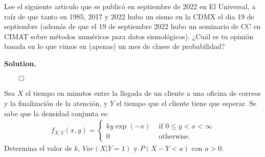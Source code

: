 \documentclass{article}
\theoremstyle{problemstyle}
\newenvironment{solution}{%
  \begin{mdframed}[linewidth=0.8pt,linecolor=Gray,backgroundcolor=Gray!5,roundcorner=5pt]%
  \noindent\textbf{Solution.}%
}{%
\hfill $ \qed $ 
  \end{mdframed}%
}
\begin{document}
\begin{problem}
Lee el siguiente articulo que se public\'o en septiembre de 2022 en El
Universal, a ra\'iz de que tanto en 1985, 2017 y 2022 hubo un sismo en la CDMX
el dia 19 de septiembre (adem\'as de que el 19 de septiembre 2022 hubo un
seminario de CC en CIMAT sobre m\'etodos num\'ericos para datos
sismol\'ogicos).
¿Cu\'al es tu opini\'on basada en lo que vimos en (apenas) un mes de clases de
probabilidad?
\end{problem}

\begin{solution}

\end{solution}

\begin{problem}
Sea $ X $ el tiempo en minutos entre la llegada de un cliente a una oficina de
correos y la finalizaci\'on de la atenci\'on, y $ Y $ el tiempo que el cliente
tiene que esperar. Se sabe que la densidad conjunta es:
\begin{align*}
	f_{X,Y}(x,y) =
	\begin{cases}
		ky\exp(-x) & \text{ if } 0\leq y<x<\infty \\
		0          & \text{ otherwise}.
	\end{cases}
\end{align*}
Determina el valor de $ k $, $ Var(X|Y=1) $ y $ P(X-Y<a) $ con $ a>0 $.
\end{problem}
\end{document}
